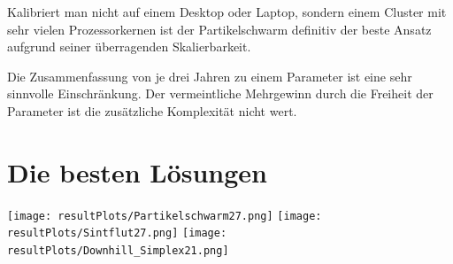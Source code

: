 \documentclass[a4paper,12pt]{article}
\begin{document}
Kalibriert man nicht auf einem Desktop oder Laptop, sondern einem Cluster mit sehr vielen Prozessorkernen ist der Partikelschwarm definitiv der beste Ansatz aufgrund seiner überragenden Skalierbarkeit.

Die Zusammenfassung von je drei Jahren zu einem Parameter ist eine sehr sinnvolle Einschränkung. Der vermeintliche Mehrgewinn durch die Freiheit der Parameter ist die zusätzliche Komplexität nicht wert.

\section{Die besten Lösungen}



\texttt{[image: resultPlots/Partikelschwarm27.png]}
\texttt{[image: resultPlots/Sintflut27.png]}
\texttt{[image: resultPlots/Downhill\_Simplex21.png]}
\end{document}
